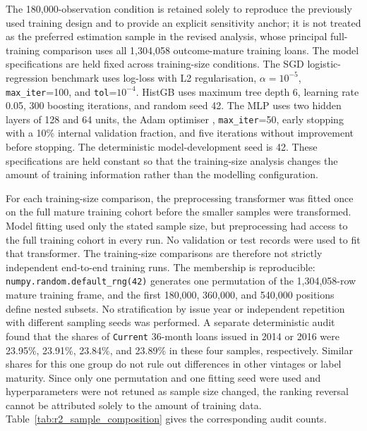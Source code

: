 \documentclass[10pt]{article}
\begin{document}
The 180,000-observation condition is retained solely to reproduce the previously used training design and to provide an explicit sensitivity anchor; it is not treated as the preferred estimation sample in the revised analysis, whose principal full-training comparison uses all 1,304,058 outcome-mature training loans. The model specifications are held fixed across training-size conditions. The SGD logistic-regression benchmark uses log-loss with L2 regularisation, $\alpha=10^{-5}$, \texttt{max\_iter}=100, and \texttt{tol}=$10^{-4}$. HistGB uses maximum tree depth 6, learning rate 0.05, 300 boosting iterations, and random seed 42. The MLP uses two hidden layers of 128 and 64 units, the Adam optimiser \cite{ref42}, \texttt{max\_iter}=50, early stopping with a 10\% internal validation fraction, and five iterations without improvement before stopping. The deterministic model-development seed is 42. These specifications are held constant so that the training-size analysis changes the amount of training information rather than the modelling configuration.

For each training-size comparison, the preprocessing transformer was fitted once on the full mature training cohort before the smaller samples were transformed. Model fitting used only the stated sample size, but preprocessing had access to the full training cohort in every run. No validation or test records were used to fit that transformer. The training-size comparisons are therefore not strictly independent end-to-end training runs. The membership is reproducible: \texttt{numpy.random.default\_rng(42)} generates one permutation of the 1,304,058-row mature training frame, and the first 180,000, 360,000, and 540,000 positions define nested subsets. No stratification by issue year or independent repetition with different sampling seeds was performed. A separate deterministic audit found that the shares of \texttt{Current} 36-month loans issued in 2014 or 2016 were 23.95\%, 23.91\%, 23.84\%, and 23.89\% in these four samples, respectively. Similar shares for this one group do not rule out differences in other vintages or label maturity. Since only one permutation and one fitting seed were used and hyperparameters were not retuned as sample size changed, the ranking reversal cannot be attributed solely to the amount of training data. Table~\ref{tab:r2_sample_composition} gives the corresponding audit counts.
\end{document}
